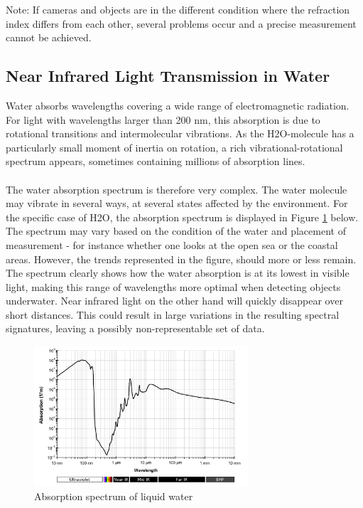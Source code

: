 \noindent
Note: If cameras and objects are in the different condition where the refraction index differs from each other, several problems occur and a precise measurement cannot be achieved.

\subsection{Near Infrared Light Transmission in Water} \label{sec:waterabs}
Water absorbs wavelengths covering a wide range of electromagnetic radiation. For light with wavelengths larger than 200 nm, this absorption is due to rotational transitions and intermolecular vibrations. As the H2O-molecule has a particularly small moment of inertia on rotation, a rich vibrational-rotational spectrum appears, sometimes containing millions of absorption lines. 
\\\\
The water absorption spectrum is therefore very complex. The water molecule may vibrate in several ways, at several states affected by the environment. For the specific case of H2O, the absorption spectrum is displayed in Figure \ref{fig:absspec} below. The spectrum may vary based on the condition of the water and placement of measurement - for instance whether one looks at the open sea or the coastal areas. However, the trends represented in the figure, should more or less remain. The spectrum clearly shows how the water absorption is at its lowest in visible light, making this range of wavelengths more optimal when detecting objects underwater. Near infrared light on the other hand will quickly disappear over short distances. This could result in large variations in the resulting spectral signatures, leaving a possibly non-representable set of data.

\begin{figure}[H]
    \centering
    \includegraphics[width=8cm]{Images/theory/Absorption_spectrum_of_liquid_water.png}
    \caption{Absorption spectrum of liquid water}
    \label{fig:absspec}
\end{figure}


